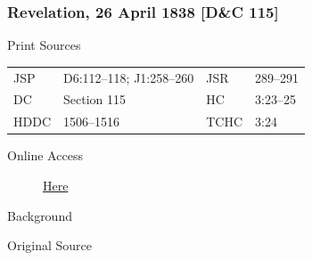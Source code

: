 		\subsubsection{Revelation, 26 April 1838 [D\&C 115]}
			\label{EMS-1838-JS-26-APR-1838}
			
			\begin{description}
					\item[Print Sources]
				\end{description}

					\begin{tabular}{p{0.5in}p{1in}p{0.5in}p{1in}}
					JSP	 	& D6:112--118; J1:258--260				& JSR 		& 289--291 \\
					DC	 	& Section 115		& HC 		& 3:23--25 \\
					HDDC 	& 1506--1516		& TCHC 		& 3:24 \\
					\end{tabular}
				
				\begin{description}
					\item[Online Access] \href{https://www.josephsmithpapers.org/paper-summary/revelation-26-april-1838-dc-115/1}{Here}
				\end{description}
				
				\begin{description}
					\item[Background]
				\end{description}
				
				
				\begin{description}
					\item[Original Source]
				\end{description}
				
				

